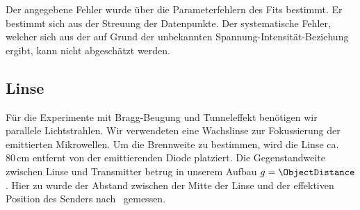 \documentclass[a4paper,10pt,twocolumn]{article}
\begin{document}
    Der angegebene Fehler wurde über die Parameterfehlern des Fits bestimmt.
    Er bestimmt sich aus der Streuung der Datenpunkte.
    Der systematische Fehler, welcher sich aus der auf Grund der unbekannten Spannung-Intensität-Beziehung ergibt, kann
    nicht abgeschätzt werden.
    
    \subsection{Linse}

    

    Für die Experimente mit Bragg-Beugung und Tunneleffekt benötigen wir parallele Lichtstrahlen. 
    Wir verwendeten eine Wachslinse zur Fokussierung der emittierten Mikrowellen. 
    Um die Brennweite zu bestimmen, wird die Linse ca.\ $80\, \mathrm{cm}$ entfernt von der emittierenden Diode platziert. 
    Die Gegenstandweite zwischen Linse und Transmitter betrug in unserem Aufbau $g = \ObjectDistance$.
    Hier zu wurde der Abstand zwischen der Mitte der Linse und der effektiven Position des Senders nach~\cite{pasco} gemessen.
    
\end{document}
